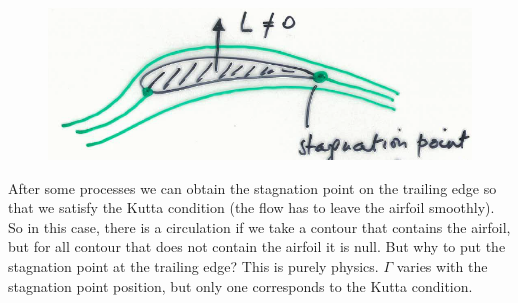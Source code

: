 		\begin{figure}
		\vspace{-5mm}
		\includegraphics[scale=0.35]{ch1/4}
		\end{figure}
		After some processes we can obtain the stagnation point on the trailing edge so that we satisfy the Kutta condition (the flow has to leave the airfoil smoothly). So in this case, there is a circulation if we take a contour that contains the airfoil, but for all contour that does not contain the airfoil it is null. But why to put the stagnation point at the trailing edge? This is purely physics. $\Gamma$ varies with the stagnation point position, but only one corresponds to the Kutta condition. \\
		
